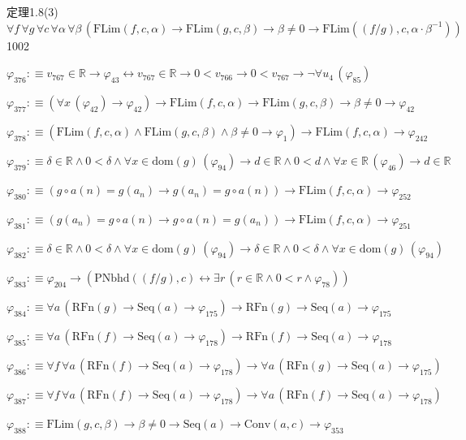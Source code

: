 \begin{fullproof}{定理1.8(3)}{$\forall f\,\forall g\,\forall c\,\forall \alpha\,\forall \beta\,(\mathrm{FLim}(f,c,\alpha) \to \mathrm{FLim}(g,c,\beta) \to \beta \neq 0 \to \mathrm{FLim}((f / g),c,\alpha \cdot \beta^{-1}))$}{1002}
\begin{abbrevlist}
\item $\varphi_{376} :\equiv v_{767} \in \mathbb{R} \to \varphi_{43} \leftrightarrow v_{767} \in \mathbb{R} \to 0 < v_{766} \to 0 < v_{767} \to \neg \forall u_{4}\,(\varphi_{85})$
\item $\varphi_{377} :\equiv (\forall x\,(\varphi_{42}) \to \varphi_{42}) \to \mathrm{FLim}(f,c,\alpha) \to \mathrm{FLim}(g,c,\beta) \to \beta \neq 0 \to \varphi_{42}$
\item $\varphi_{378} :\equiv (\mathrm{FLim}(f,c,\alpha) \land \mathrm{FLim}(g,c,\beta) \land \beta \neq 0 \to \varphi_{1}) \to \mathrm{FLim}(f,c,\alpha) \to \varphi_{242}$
\item $\varphi_{379} :\equiv \delta \in \mathbb{R} \land 0 < \delta \land \forall x \in \mathrm{dom}(g)\,(\varphi_{94}) \to d \in \mathbb{R} \land 0 < d \land \forall x \in \mathbb{R}\,(\varphi_{46}) \to d \in \mathbb{R}$
\item $\varphi_{380} :\equiv (g \circ a(n) = g(a_{n}) \to g(a_{n}) = g \circ a(n)) \to \mathrm{FLim}(f,c,\alpha) \to \varphi_{252}$
\item $\varphi_{381} :\equiv (g(a_{n}) = g \circ a(n) \to g \circ a(n) = g(a_{n})) \to \mathrm{FLim}(f,c,\alpha) \to \varphi_{251}$
\item $\varphi_{382} :\equiv \delta \in \mathbb{R} \land 0 < \delta \land \forall x \in \mathrm{dom}(g)\,(\varphi_{94}) \to \delta \in \mathbb{R} \land 0 < \delta \land \forall x \in \mathrm{dom}(g)\,(\varphi_{94})$
\item $\varphi_{383} :\equiv \varphi_{204} \to (\mathrm{PNbhd}((f / g),c) \leftrightarrow \exists r\,(r \in \mathbb{R} \land 0 < r \land \varphi_{78}))$
\item $\varphi_{384} :\equiv \forall a\,(\mathrm{RFn}(g) \to \mathrm{Seq}(a) \to \varphi_{175}) \to \mathrm{RFn}(g) \to \mathrm{Seq}(a) \to \varphi_{175}$
\item $\varphi_{385} :\equiv \forall a\,(\mathrm{RFn}(f) \to \mathrm{Seq}(a) \to \varphi_{178}) \to \mathrm{RFn}(f) \to \mathrm{Seq}(a) \to \varphi_{178}$
\item $\varphi_{386} :\equiv \forall f\,\forall a\,(\mathrm{RFn}(f) \to \mathrm{Seq}(a) \to \varphi_{178}) \to \forall a\,(\mathrm{RFn}(g) \to \mathrm{Seq}(a) \to \varphi_{175})$
\item $\varphi_{387} :\equiv \forall f\,\forall a\,(\mathrm{RFn}(f) \to \mathrm{Seq}(a) \to \varphi_{178}) \to \forall a\,(\mathrm{RFn}(f) \to \mathrm{Seq}(a) \to \varphi_{178})$
\item $\varphi_{388} :\equiv \mathrm{FLim}(g,c,\beta) \to \beta \neq 0 \to \mathrm{Seq}(a) \to \mathrm{Conv}(a,c) \to \varphi_{353}$

\end{abbrevlist}
\end{fullproof}
